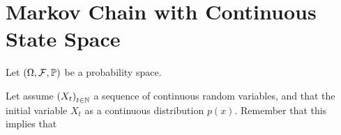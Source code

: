 \documentclass{report}
\theoremstyle{definition}
\begin{document}
\section{Markov Chain with Continuous State Space}

Let $\left( \Omega,\mathcal{F},\mathbb{P} \right)$ be a probability space. 

Let assume $\left(X_t \right)_{t\in\mathbb{N}}$ a sequence of continuous random
variables, and that the initial variable $X_t$ as a continuous
distribution $p(x)$. Remember that this implies that 
\end{document}
